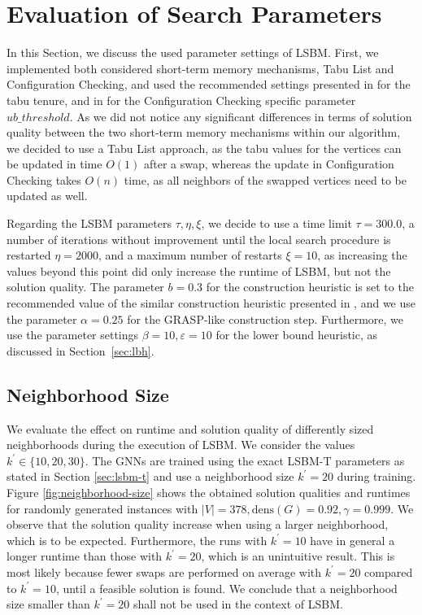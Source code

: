 \documentclass[draft,final]{vutinfth} %
\begin{document}
\section{Evaluation of Search Parameters}\label{sec:lsbm}
In this Section, we discuss the used parameter settings of LSBM. 
First, we implemented both considered short-term memory mechanisms, Tabu List and Configuration Checking, and used the recommended settings presented in \cite{zhou_opposition-based_2020} for the tabu tenure, and in \cite{chen_nuqclq_2021} for the Configuration Checking specific parameter $\mathit{ub}\_threshold$. 
As we did not notice any significant differences in terms of solution quality between the two short-term memory mechanisms within our algorithm, we decided to use a Tabu List approach, as the tabu values for the vertices can be updated in time $O(1)$ after a swap, whereas the update in Configuration Checking takes $O(n)$ time, as all neighbors of the swapped vertices need to be updated as well. 

Regarding the LSBM parameters $\tau, \eta, \xi$, we decide to use a time limit $\tau=300.0$, a number of iterations without improvement until the local search procedure is restarted $\eta=2000$, and a maximum number of restarts $\xi=10$, as increasing the values beyond this point did only increase the runtime of LSBM, but not the solution quality. 
The parameter $b=0.3$ for the construction heuristic is set to the recommended value of the similar construction heuristic presented in \cite{chen_nuqclq_2021}, and we use the parameter $\alpha=0.25$ for the GRASP-like construction step. 
Furthermore, we use the parameter settings $\beta=10, \varepsilon=10$ for the lower bound heuristic, as discussed in Section~\ref{sec:lbh}. 

\subsection{Neighborhood Size}
We evaluate the effect on runtime and solution quality of differently sized neighborhoods during the execution of LSBM. We consider the values $k^\prime \in \{10,20,30\}$. 
The GNNs are trained using the exact LSBM-T parameters as stated in Section \ref{sec:lsbm-t} and use a neighborhood size $k^\prime=20$ during training. 
Figure \ref{fig:neighborhood-size} shows the obtained solution qualities and runtimes for randomly generated instances with $|V|=378, \mathrm{dens}(G)=0.92, \gamma=0.999$. We observe that the solution quality increase when using a larger neighborhood, which is to be expected. Furthermore, the runs with $k^\prime = 10$ have in general a longer runtime than those with $k^\prime=20$, which is an unintuitive result. This is most likely because fewer swaps are performed on average with $k^\prime=20$ compared to $k^\prime=10$, until a feasible solution is found. 
We conclude that a neighborhood size smaller than $k^\prime=20$ shall not be used in the context of LSBM. 
\end{document}
